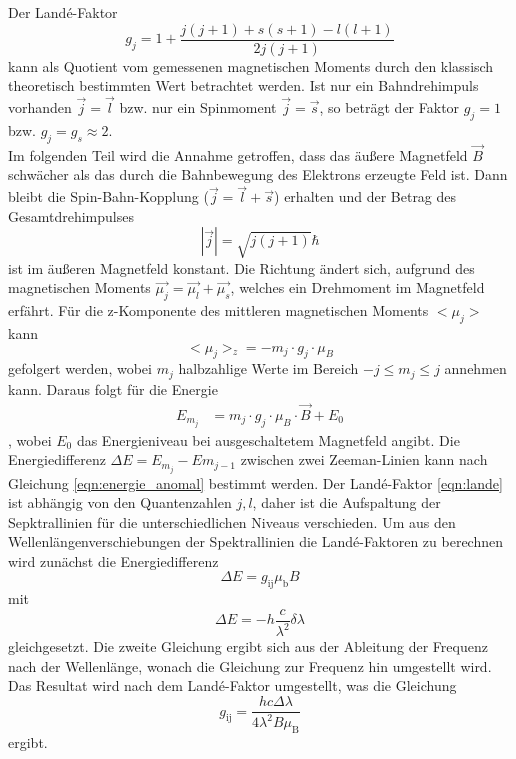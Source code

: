 Der Landé-Faktor
\begin{equation}
    g_j = 1 + \frac{j(j+1) + s(s+1) - l(l+1)}{2j(j+1)}
    \label{eqn:lande}
\end{equation}
kann als Quotient vom gemessenen magnetischen Moments durch den klassisch theoretisch bestimmten Wert betrachtet werden.
Ist nur ein Bahndrehimpuls vorhanden $\vec{j}=\vec{l}$ bzw. nur ein Spinmoment $\vec{j}=\vec{s}$, so beträgt der Faktor $g_j=1$ bzw. $g_j = g_s \approx 2$.
\\
Im folgenden Teil wird die Annahme getroffen, dass das äußere Magnetfeld $\vec{B}$ schwächer als das durch die Bahnbewegung des Elektrons erzeugte Feld ist.
Dann bleibt die Spin-Bahn-Kopplung ($\vec{j}=\vec{l}+\vec{s}$) erhalten und der Betrag des Gesamtdrehimpulses
\begin{equation*}
    |\vec{j}| = \sqrt{j(j+1)} \hbar
\end{equation*}
ist im äußeren Magnetfeld konstant.
Die Richtung ändert sich, aufgrund des magnetischen Moments $\vec{\mu_j} = \vec{\mu_l} + \vec{\mu_s}$, welches ein Drehmoment im Magnetfeld erfährt.
Für die z-Komponente des mittleren magnetischen Moments $<\mu_j>$ kann
\begin{equation*}
    <\mu_j>_z = - m_j \cdot g_j \cdot \mu_B
\end{equation*}
gefolgert werden, wobei $m_j$ halbzahlige Werte im Bereich $-j \leq m_j \leq j$ annehmen kann.
Daraus folgt für die Energie
\begin{align}
    E_{m_j} &= m_j \cdot g_j \cdot \mu_B \cdot \vec{B} + E_0
    \label{eqn:energie_anomal}
\end{align}
, wobei $E_0$ das Energieniveau bei ausgeschaltetem Magnetfeld angibt.
Die Energiedifferenz $\Delta E = E_{m_j} - E{m_{j-1}}$ zwischen zwei Zeeman-Linien kann nach Gleichung \eqref{eqn:energie_anomal} bestimmt werden.
Der Landé-Faktor \eqref{eqn:lande} ist abhängig von den Quantenzahlen $j,l$, daher ist die Aufspaltung der Sepktrallinien für die unterschiedlichen Niveaus verschieden.
Um aus den Wellenlängenverschiebungen der Spektrallinien die Landé-Faktoren zu berechnen wird zunächst die Energiedifferenz
\begin{equation*}
    \Delta E = g _\text{ij} \mu _\text{b} B
\end{equation*}
mit 
\begin{equation*}
    \Delta E = -h \frac{c}{\lambda^2} \delta \lambda
\end{equation*}
gleichgesetzt.
Die zweite Gleichung ergibt sich aus der Ableitung der Frequenz nach der Wellenlänge, wonach die Gleichung zur Frequenz hin umgestellt wird.
Das Resultat wird nach dem Landé-Faktor umgestellt, was die Gleichung 
\begin{equation}
    g_\text{ij} = \frac{hc \Delta \lambda}{4 \lambda^2 B \mu_\text{B}}
    \label{eq:Lande_Faktor}
\end{equation}
ergibt.
\FloatBarrier


